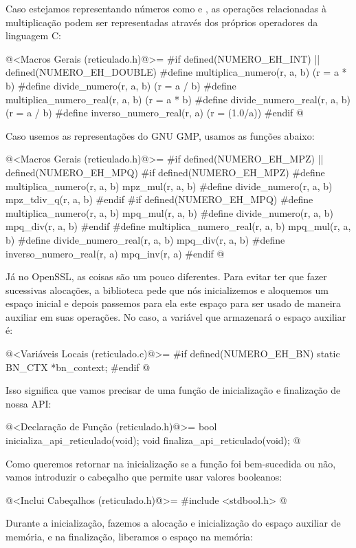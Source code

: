 Caso estejamos representando números como 
e , as operações relacionadas à multiplicação podem
ser representadas através dos próprios operadores da linguagem C:

\iniciocodigo
@<Macros Gerais (reticulado.h)@>=
#if defined(NUMERO_EH_INT) || defined(NUMERO_EH_DOUBLE)
#define multiplica_numero(r, a, b) (r = a * b)
#define divide_numero(r, a, b) (r = a / b)
#define multiplica_numero_real(r, a, b) (r = a * b)
#define divide_numero_real(r, a, b) (r = a / b)
#define inverso_numero_real(r, a) (r = (1.0/a))
#endif
@
\fimcodigo

Caso usemos as representações do GNU GMP, usamos as funções abaixo:

\iniciocodigo
@<Macros Gerais (reticulado.h)@>=
#if defined(NUMERO_EH_MPZ) || defined(NUMERO_EH_MPQ)
#if defined(NUMERO_EH_MPZ)
#define multiplica_numero(r, a, b) mpz_mul(r, a, b)
#define divide_numero(r, a, b) mpz_tdiv_q(r, a, b)
#endif
#if defined(NUMERO_EH_MPQ)
#define multiplica_numero(r, a, b) mpq_mul(r, a, b)
#define divide_numero(r, a, b) mpq_div(r, a, b)
#endif
#define multiplica_numero_real(r, a, b) mpq_mul(r, a, b)
#define divide_numero_real(r, a, b) mpq_div(r, a, b)
#define inverso_numero_real(r, a) mpq_inv(r, a)
#endif
@
\fimcodigo

Já no OpenSSL, as coisas são um pouco diferentes. Para evitar ter que
fazer sucessivas alocações, a biblioteca pede que nós inicializemos e
aloquemos um espaço inicial e depois passemos para ela este espaço
para ser usado de maneira auxiliar em suas operações. No caso, a
variável que armazenará o espaço auxiliar é:

\iniciocodigo
@<Variáveis Locais (reticulado.c)@>=
#if defined(NUMERO_EH_BN)
static BN_CTX *bn_context;
#endif
@
\fimcodigo

Isso significa que vamos precisar de uma função de inicialização e
finalização de nossa API:

\iniciocodigo
@<Declaração de Função (reticulado.h)@>=
bool inicializa_api_reticulado(void);
void finaliza_api_reticulado(void);
@
\fimcodigo

Como queremos retornar na inicialização se a função foi bem-sucedida
ou não, vamos introduzir o cabeçalho que permite usar valores
booleanos:

\iniciocodigo
@<Inclui Cabeçalhos (reticulado.h)@>=
#include <stdbool.h>
@
\fimcodigo

Durante a inicialização, fazemos a alocação e inicialização do espaço
auxiliar de memória, e na finalização, liberamos o espaço na memória:

